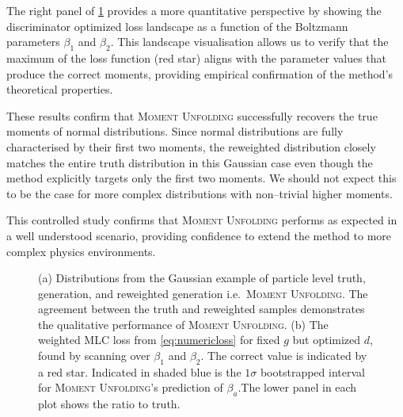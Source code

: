             The right panel of \cref{fig:gauss} provides a more quantitative perspective by showing the discriminator optimized loss landscape as a function of the Boltzmann parameters $\beta_1$ and $\beta_2$.
            This landscape visualisation allows us to verify that the maximum of the loss function (red star) aligns with the parameter values that produce the correct moments, providing empirical confirmation of the method's theoretical properties.

            These results confirm that \textsc{Moment Unfolding} successfully recovers the true moments of normal distributions.
            Since normal distributions are fully characterised by their first two moments, the reweighted distribution closely matches the entire truth distribution in this Gaussian case even though the method explicitly targets only the first two moments.
            We should not expect this to be the case for more complex distributions with non--trivial higher moments.

        This controlled study confirms that \textsc{Moment Unfolding} performs as expected in a well understood scenario, providing confidence to extend the method to more complex physics environments.
\begin{figure}
    \centering
    \caption{
    (a) Distributions from the Gaussian example of particle level truth, generation, and reweighted generation i.e.~\textsc{Moment Unfolding}.
    The agreement between the truth and reweighted samples demonstrates the qualitative performance of \textsc{Moment Unfolding}.
    (b) The weighted MLC loss from \cref{eq:numericloss} for fixed $g$ but optimized $d$, found by scanning over $\beta_1$ and $\beta_2$.
    The correct value is indicated by a red star.
    Indicated in shaded blue is the $1\sigma$ bootstrapped interval for \textsc{Moment Unfolding}'s prediction of $\beta_a$.The lower panel in each plot shows the ratio to truth.
    }
        \label{fig:gauss}
\end{figure}
